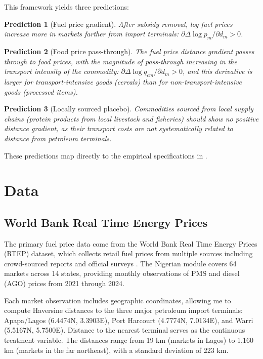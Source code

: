 \documentclass[12pt]{article}
\begin{document}
This framework yields three predictions:

\medskip
\noindent\textbf{Prediction 1} (Fuel price gradient). \textit{After subsidy removal, log fuel prices increase more in markets farther from import terminals: $\partial \Delta \log p_m / \partial d_m > 0$.}

\medskip
\noindent\textbf{Prediction 2} (Food price pass-through). \textit{The fuel price distance gradient passes through to food prices, with the magnitude of pass-through increasing in the transport intensity of the commodity: $\partial \Delta \log q_{cm} / \partial d_m > 0$, and this derivative is larger for transport-intensive goods (cereals) than for non-transport-intensive goods (processed items).}

\medskip
\noindent\textbf{Prediction 3} (Locally sourced placebo). \textit{Commodities sourced from local supply chains (protein products from local livestock and fisheries) should show no positive distance gradient, as their transport costs are not systematically related to distance from petroleum terminals.}

\medskip
These predictions map directly to the empirical specifications in .


\section{Data}
\label{sec:data}

\subsection{World Bank Real Time Energy Prices}

The primary fuel price data come from the World Bank Real Time Energy Prices (RTEP) dataset, which collects retail fuel prices from multiple sources including crowd-sourced reports and official surveys \citep{WorldBank2023}. The Nigerian module covers 64 markets across 14 states, providing monthly observations of PMS and diesel (AGO) prices from 2021 through 2024.

Each market observation includes geographic coordinates, allowing me to compute Haversine distances to the three major petroleum import terminals: Apapa/Lagos (6.4474\textdegree N, 3.3903\textdegree E), Port Harcourt (4.7774\textdegree N, 7.0134\textdegree E), and Warri (5.5167\textdegree N, 5.7500\textdegree E). Distance to the nearest terminal serves as the continuous treatment variable. The distances range from 19 km (markets in Lagos) to 1,160 km (markets in the far northeast), with a standard deviation of 223 km.
\end{document}
